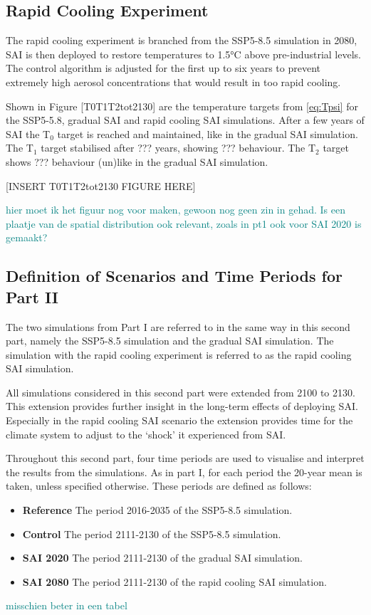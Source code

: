 \subsection{Rapid Cooling Experiment}
The rapid cooling experiment is branched from the SSP5-8.5 simulation in 2080, SAI is then deployed to restore temperatures to 1.5°C above pre-industrial levels. The control algorithm is adjusted for the first up to six years to prevent extremely high aerosol concentrations that would result in too rapid cooling. 

Shown in Figure [T0T1T2tot2130] are the temperature targets from \ref{eq:Tpsi} for the SSP5-5.8, gradual SAI and rapid cooling SAI simulations. After a few years of SAI the T$_0$ target is reached and maintained, like in the gradual SAI simulation. The T$_1$ target stabilised after ??? years, showing ??? behaviour. The T$_2$ target shows ??? behaviour (un)like in the gradual SAI simulation.

[INSERT T0T1T2tot2130 FIGURE HERE]

\textcolor{teal}{hier moet ik het figuur nog voor maken, gewoon nog geen zin in gehad. Is een plaatje van de spatial distribution ook relevant, zoals in pt1 ook voor SAI 2020 is gemaakt?}


\subsection{Definition of Scenarios and Time Periods for Part II}
The two simulations from Part I are referred to in the same way in this second part, namely the SSP5-8.5 simulation and the gradual SAI simulation. The simulation with the rapid cooling experiment is referred to as the rapid cooling SAI simulation. 

All simulations considered in this second part were extended from 2100 to 2130. This extension provides further insight in the long-term effects of deploying SAI. Especially in the rapid cooling SAI scenario the extension provides time for the climate system to adjust to the `shock' it experienced from SAI. 

Throughout this second part, four time periods are used to visualise and interpret the results from the simulations. As in part I, for each period the 20-year mean is taken, unless specified otherwise. These periods are defined as follows:

\begin{itemize}
    \item \textbf{Reference} The period 2016-2035 of the SSP5-8.5 simulation.
    \item \textbf{Control} The period 2111-2130 of the SSP5-8.5 simulation.
    \item \textbf{SAI 2020} The period 2111-2130 of the gradual SAI simulation.
    \item \textbf{SAI 2080} The period 2111-2130 of the rapid cooling SAI simulation.
\end{itemize} 
\textcolor{teal}{misschien beter in een tabel}

